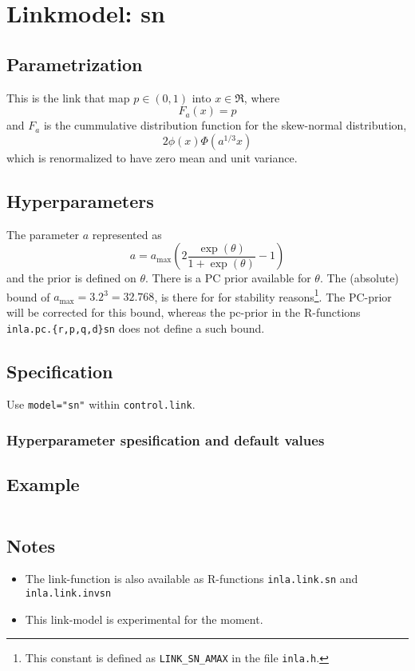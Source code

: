 \documentclass[a4paper,11pt]{article}
\begin{document}
\section*{Linkmodel: sn}

\subsection*{Parametrization}

This is the link that map $p\in (0,1)$ into $x\in\Re$, where
\begin{displaymath}
    F_{a}(x) = p
\end{displaymath}
and $F_{a}$ is the cummulative distribution function for the
skew-normal distribution,
\begin{displaymath}
    2\phi(x)\Phi(a^{1/3}x)
\end{displaymath}
which is renormalized to have zero mean and unit variance.

\subsection*{Hyperparameters}

The  parameter $a$ represented as
\begin{displaymath}
    a = a_{\text{max}} \left(2\frac{\exp(\theta)}{1+ \exp(\theta)} -1\right)
\end{displaymath}
and the prior is defined on $\theta$. There is a PC prior available
for $\theta$. The (absolute) bound of
$a_{\text{max}} = 3.2^{3} = 32.768$, is there for for stability
reasons\footnote{This constant is defined as \texttt{LINK\_SN\_AMAX}
    in the file \texttt{inla.h}.}. The PC-prior will be corrected for
this bound, whereas the pc-prior in the R-functions
\texttt{inla.pc.\{r,p,q,d\}sn} does not define a such bound.

\subsection*{Specification}

Use \texttt{model="sn"} within \texttt{control.link}.  

\subsubsection*{Hyperparameter spesification and default values}


\subsection*{Example}

\begin{verbatim}
\end{verbatim}

\subsection*{Notes}

\begin{itemize}
\item The link-function is also available as R-functions
    \texttt{inla.link.sn} and \texttt{inla.link.invsn}
\item This link-model is experimental for the moment.
\end{itemize}
\end{document}
